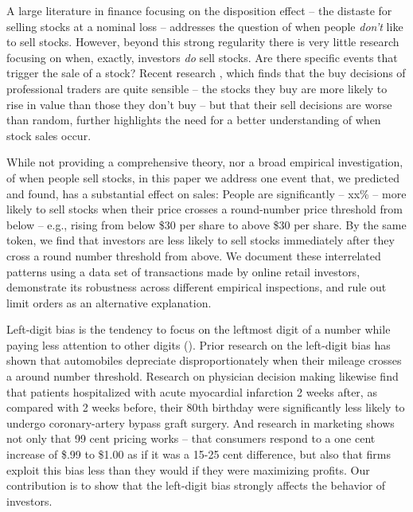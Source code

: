 A large literature in finance focusing on the disposition effect -- the distaste for selling stocks at a nominal loss -- addresses the question of when people \textit{don't} like to sell stocks.  However, beyond this strong regularity there is very little research focusing on when, exactly, investors \textit{do} sell stocks. Are there specific events that trigger the sale of a stock? 
Recent research \citep{akepanidtaworn2019selling}, which finds that the buy decisions of professional traders are quite sensible -- the stocks they buy are more likely to rise in value than those they don't buy -- but that their sell decisions are worse than random, further highlights the need for a better understanding of when stock sales occur. 

While not providing a comprehensive theory, nor a broad empirical investigation, of when people sell stocks, in this paper we address one event that, we predicted and found, has a substantial effect on sales: People are significantly -- xx\% -- more likely to sell stocks when their price crosses a round-number price threshold from below -- e.g., rising from below \$30 per share to above \$30 per share. By the same token, we find that investors are  less likely to sell stocks immediately after they cross a round number threshold from above.  We document these interrelated patterns using a data set of transactions made by online retail investors, demonstrate its robustness across different empirical inspections, and rule out limit orders as an alternative explanation. 

Left-digit bias is the tendency to focus on the leftmost digit of a number while paying less attention to other digits (\citealp{poltrock1984comparative}). Prior research on the left-digit bias has shown that automobiles depreciate disproportionately when their mileage crosses a around number threshold.  Research on physician decision making likewise find that patients hospitalized with acute myocardial infarction 2 weeks after, as compared with 2 weeks before, their 80th birthday were significantly less likely to undergo coronary-artery bypass graft surgery.  And research in marketing \citep{shlain2018more} shows not only that 99 cent pricing works -- that consumers respond to a one cent increase of \$.99 to \$1.00 as if it was a 15-25 cent difference, but also that firms exploit this bias less than they would if they were maximizing profits.  Our contribution is to show that the left-digit bias strongly affects the behavior of investors.



